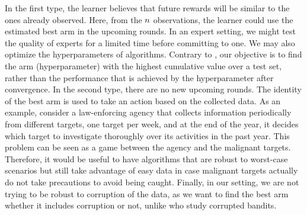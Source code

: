 In the first type, the learner believes that future rewards will be similar to the ones already observed. 
Here, from the $n$ observations, the learner could use the estimated best arm in the upcoming rounds. 
In an expert setting, we might test the quality 
of experts for a limited time before committing to one.
We may also optimize the hyperparameters of algorithms. 
Contrary to \cite{Jamieson16NS}, our objective is to find the 
arm (hyperparameter) with the highest cumulative value over a test set, rather than the performance that is achieved by the hyperparameter after convergence. %
In the second type, there are no new upcoming rounds.
The identity of the best arm is used to take an action based on the collected data.
%
As an example, consider a law-enforcing agency that collects 
information periodically from different targets, one target per week, and at the end of the year, it  
decides which target to investigate 
thoroughly over its activities in the past year.
This problem can 
be seen as a game between the agency and the malignant 
targets. Therefore, it would be useful to have algorithms that are 
robust to worst-case scenarios but still take advantage 
of easy data in case malignant targets actually do not take precautions to avoid being caught. %
%
Finally, in our setting, we are not trying to be robust to 
corruption of the data, as we want to find the best arm whether it includes corruption or not,
 unlike %
\citet{Altschuler18BA} who study corrupted bandits.
%
%